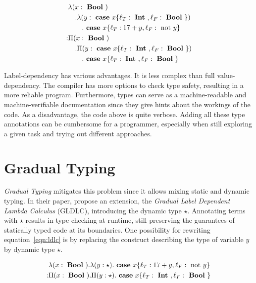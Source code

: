 \begin{equation}\label{eqn:ldlc}
\begin{split}
&\lambda (x: \text{ \textbf{Bool} }) \\
&\quad . \lambda (y: \text{ \textbf{case} } x \{\ell_T: \text{ \textbf{Int} }, \ell_F: \text{ \textbf{Bool} }\} ) \\
&\qquad . \text{ \textbf{case} } x \{\ell_T: 17+y,\ell_F: \text{ not } y\} \\
: & \Pi(x : \text{ \textbf{Bool} }) \\
&\quad . \Pi (y: \text{ \textbf{case} } x \{\ell_T: \text{ \textbf{Int} }, \ell_F: \text{ \textbf{Bool} }\} ) \\
&\qquad . \text{ \textbf{case} } x \{\ell_T: \text{ \textbf{Int} }, \ell_F: \text{ \textbf{Bool} } \}
\end{split}
\end{equation}

Label-dependency has various advantages. It is less complex than full value-dependency. The compiler has more options to check type safety, resulting in a more reliable program. Furthermore, types can serve as a machine-readable and machine-verifiable documentation since they give hints about the workings of the code.
As a disadvantage, the code above is quite verbose. Adding all these type annotations can be cumbersome for a programmer, especially when still exploring a given task and trying out different approaches.

\section{Gradual Typing}

\emph{Gradual Typing} mitigates this problem since it allows mixing static and dynamic typing. In their paper, \cite{fu2021} propose an extension, the \emph{Gradual Label Dependent Lambda Calculus} (GLDLC), introducing the dynamic type $\star$. Annotating terms with $\star$ results in type checking at runtime, still preserving the guarantees of statically typed code at its boundaries. One possibility for rewriting equation~\ref{eqn:ldlc} is by replacing the \case construct describing the type of variable $y$ by dynamic type $\star$.

\begin{equation}\label{eqn:gldlc}
\begin{split}
&\lambda (x: \text{ \textbf{Bool} })
. \lambda (y: \star)
. \text{ \textbf{case} } x \{\ell_T: 17+y,\ell_F: \text{ not } y\} \\
: & \Pi(x : \text{ \textbf{Bool} })
. \Pi (y: \star)
. \text{ \textbf{case} } x \{\ell_T: \text{ \textbf{Int} }, \ell_F: \text{ \textbf{Bool} } \}
\end{split}
\end{equation}

